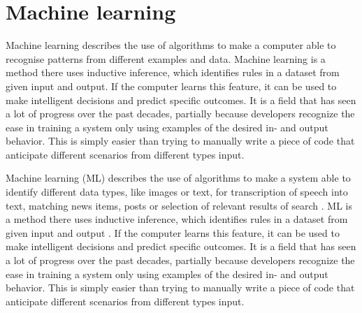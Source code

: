 \section{Machine learning}
Machine learning describes the use of algorithms to make a computer able to recognise patterns from different examples and data. Machine learning is a method there uses inductive inference, which identifies rules in a dataset from given input and output. If the computer learns this feature, it can be used to make intelligent decisions and predict specific outcomes.\citep{Nielsen2010}
It is a field that has seen a lot of progress over the past decades, partially because developers recognize the ease in training a system only using examples of the desired in- and output behavior. This is simply easier than trying to manually write a piece of code that anticipate different scenarios from different types input.\citep{Jordan2015}



Machine learning (ML) describes the use of algorithms to make a system able to identify different data types, like images or text, for transcription of speech into text, matching news items, posts or selection of relevant results of search \citep{LeCun2015}.
ML is a method there uses inductive inference, which identifies rules in a dataset from given input and output \citep{Nielsen2010}. If the computer learns this feature, it can be used to make intelligent decisions and predict specific outcomes. \citep{Nielsen2010}
It is a field that has seen a lot of progress over the past decades, partially because developers recognize the ease in training a system only using examples of the desired in- and output behavior. This is simply easier than trying to manually write a piece of code that anticipate different scenarios from different types input. \citep{Jordan2015}


